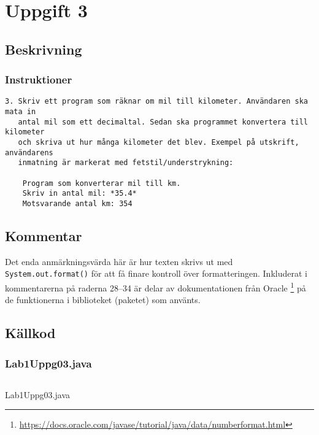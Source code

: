\section{Uppgift 3}\label{uppgift-3}

\subsection{Beskrivning}
\subsubsection*{Instruktioner}
\begin{verbatim}
3. Skriv ett program som räknar om mil till kilometer. Användaren ska mata in
   antal mil som ett decimaltal. Sedan ska programmet konvertera till kilometer
   och skriva ut hur många kilometer det blev. Exempel på utskrift, användarens
   inmatning är markerat med fetstil/understrykning:

    Program som konverterar mil till km.
    Skriv in antal mil: *35.4*
    Motsvarande antal km: 354
\end{verbatim}

\subsection{Kommentar}
Det enda anmärkningsvärda här är hur texten skrivs ut med
\texttt{System.out.format()} för att få finare kontroll över formatteringen.
Inkluderat i kommentarerna på raderna \numrange{28}{34} är delar av
dokumentationen från Oracle
\footnote{\url{https://docs.oracle.com/javase/tutorial/java/data/numberformat.html}}
på de funktionerna i biblioteket (paketet) som använts.


\subsection{Källkod}\label{uppgift-3_src}
\subsubsection*{Lab1Uppg03.java}
    \inputminted[linenos]{java}{src/Lab1Uppg03.java}
    \caption{Lab1Uppg03.java}
    \label{Uppg3src}
